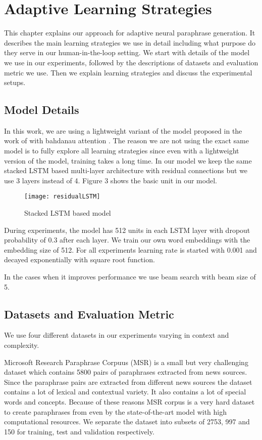 \chapter{Adaptive Learning Strategies}\label{approach}

This chapter explains our approach for adaptive neural paraphrase generation. It describes the main learning strategies we use in detail including what purpose do they serve in our human-in-the-loop setting. We start with details of the model we use in our experiments, followed by the descriptions of datasets and evaluation metric we use. Then we explain learning strategies and discuss the experimental setups.

\section{Model Details}

In this work, we are using a lightweight variant of the model proposed in the work of \cite{Prakashetal} with bahdanau attention \cite{bahdanau}. The reason we are not using the exact same model is to fully explore all learning strategies since even with a lightweight version of the model, training takes a long time. In our model we keep the same stacked LSTM based multi-layer architecture with residual connections but we use 3 layers instead of 4. Figure 3 shows the basic unit in our model.

\begin{figure}[t]
\texttt{[image: residualLSTM]}
\centering
\caption{Stacked LSTM based model \cite{Prakashetal}}
\end{figure}


During experiments, the model has 512 units in each LSTM layer with dropout probability of 0.3 after each layer. We train our own word embeddings with the embedding size of 512. For all experiments learning rate is started with 0.001 and decayed exponentially with square root function.

In the cases when it improves performance we use beam search with beam size of 5.

\section{Datasets and Evaluation Metric}

We use four different datasets in our experiments varying in context and complexity. 

Microsoft Research Paraphrase Corpuus (MSR) \cite{msrp} is a small but very challenging dataset which contains 5800 pairs of paraphrases extracted from news sources. Since the paraphrase pairs are extracted from different news sources the dataset contains a lot of lexical and contextual variety. It also contains a lot of special words and concepts. Because of these reasons MSR corpus is a very hard dataset to create paraphrases from even by the state-of-the-art model with high computational resources. We separate the dataset into subsets of 2753, 997 and 150 for training, test and validation respectively.

